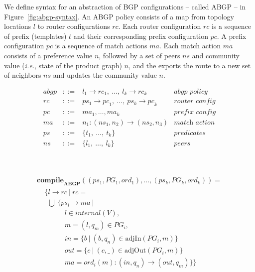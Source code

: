 \documentclass[twocolumn]{sig-alternate-10pt}
\newcommand{\IE}{\emph{i.e.}}
\begin{document}
We define syntax for an abstraction of BGP configurations -- called ABGP -- in Figure~\ref{fig:abgp-syntax}. An ABGP policy consists of a map from topology locations $l$ to router configurations $rc$. Each router configuration $rc$ is a sequence of prefix (templates) $t$ and their corresponding prefix configuration $pc$. A prefix configuration $pc$ is a sequence of match actions $ma$. Each match action $ma$ consists of a preference value $n$, followed by a set of peers $ns$ and community value (\IE, state of the product graph) $n$, and the exports the route to a new set of neighbors $ns$ and updates the community value $n$.

\vspace{2em}
\begin{figure}[h!]\small

  \hrulefill%
  \vspace{1em}

  \begin{minipage}[t]{.5\linewidth}
  \vspace*{-1\baselineskip}
  \[ \begin{array}{rclr}
     abgp &::=& l_1 \rightarrow {rc}_1, ~\dots,~ l_k \rightarrow {rc}_k & \textit{abgp policy} \\
     rc   &::=& ps_1 \rightarrow {pc}_1, ~\dots,~ ps_k \rightarrow {pc}_k & \textit{router config} \\
     pc   &::=& ma_1, \dots, ma_k & \textit{prefix config} \\
     ma   &::=& n_1 : ({ns}_1, n_2) \rightarrow ({ns}_2, n_3) & \textit{match action} \\
     ps   &::=& \{ t_1, ~\dots,~ t_k \} & \textit{predicates} \\
     ns   &::=& \{ l_1, ~\dots,~ l_k \} & \textit{peers} \\
  \end{array} \]%

  \end{minipage}
  ~~
  \vrule
  ~~
  \begin{minipage}[t]{.5\linewidth}
  \vspace*{-1\baselineskip}
  \[ \begin{array}{l}
     \textbf{compile}_\textbf{ABGP}( (ps_1,PG_1,ord_1), \dots, (ps_k,PG_k,ord_k) ) = \\
     ~~~~~ \{ l \rightarrow rc ~\vert~ rc = \\
     ~~~~~~~ \bigcup~ \{ ps_i \rightarrow ma ~\vert~ \\
     ~~~~~~~~~~~~~~~~~~ l \in internal(V), \\
     ~~~~~~~~~~~~~~~~~~ m = (l,q_m) \in PG_i, \\
     ~~~~~~~~~~~~~~~~~~ in = \{ b ~\vert~ (b,q_n) \in \text{adjIn}(PG_i,m) \} \\
     ~~~~~~~~~~~~~~~~~~ out = \{ c ~\vert~ (c,\_) \in \text{adjOut}(PG_i,m) \} \\
     ~~~~~~~~~~~~~~~~~~ ma = ord_i(m) : (in,q_n) \rightarrow (out,q_m) \} \} \\
  \end{array} \]%


\end{minipage}
\end{figure}
\end{document}
